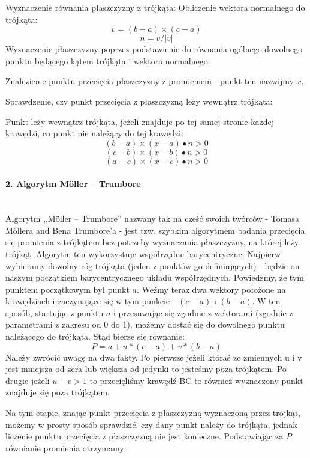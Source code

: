 \begin{outline}[enumerate]

\1 Wyznaczenie równania płaszczyzny z trójkąta:
\2 Obliczenie wektora normalnego do trójkąta:
	$$v = (b - a) \times (c - a)$$
	$$n = v/|v|$$
\2 Wyznaczenie płaszczyzny poprzez podstawienie do równania ogólnego  dowolnego punktu będącego kątem trójkąta i wektora normalnego.

\1 Znalezienie punktu przecięcia płaszczyzny z promieniem - punkt ten nazwijmy $x$.

\1 Sprawdzenie, czy punkt przecięcia z płaszczyzną leży wewnątrz trójkąta:

\2 Punkt leży wewnątrz trójkąta, jeżeli znajduje po tej samej stronie każdej krawędzi, co punkt nie należący do tej krawędzi:
$$(b - a) \times (x - a) \bullet n > 0$$
$$(c - b) \times (x - b) \bullet n > 0$$
$$(a - c) \times (x - c) \bullet n > 0$$

\end{outline}
\paragraph{2. Algorytm Möller – Trumbore}\mbox{} \\

Algorytm ,,Möller – Trumbore'' nazwany tak na cześć swoich twórców - Tomasa Möllera and Bena Trumbore'a - jest tzw. szybkim algorytmem badania przecięcia się promienia z trójkątem bez potrzeby wyznaczania płaszczyzny, na której leży trójkąt. Algorytm ten wykorzystuje współrzędne barycentryczne. Najpierw wybieramy dowolny róg trójkąta (jeden z punktów go definiujących) - będzie on naszym początkiem barycentrycznego układu współrzędnych. Powiedzmy, że tym punktem początkowym był punkt $a$. Weźmy teraz dwa wektory położone na krawędziach i zaczynające się w tym punkcie - $(c - a)$ i $(b - a)$. W ten sposób, startując z punktu $a$ i przesuwając się zgodnie z wektorami (zgodnie z parametrami z zakresu od 0 do 1), możemy dostać się do dowolnego punktu należącego do trójkąta. Stąd bierze się równanie:
$$P = a + u * (c - a) + v * (b - a)$$
Należy zwrócić uwagę na dwa fakty. Po pierwsze jeżeli któraś ze zmiennych u i v jest mniejsza od zera lub większa od jedynki to jesteśmy poza trójkątem. Po drugie jeżeli $u + v > 1$ to przecięliśmy krawędź BC to również wyznaczony punkt znajduje się poza trójkątem.


Na tym etapie, znając punkt przecięcia z płaszczyzną wyznaczoną przez trójkąt, możemy w prosty sposób sprawdzić, czy dany punkt należy do trójkąta, jednak liczenie punktu przecięcia z płaszczyzną nie jest konieczne. Podstawiając za $P$ równianie promienia otrzymamy:

